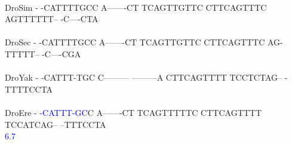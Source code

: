 \documentclass[11pt,twoside,reqno,a4paper]{article}
\begin{document}
{\hspace*{7\charwidth}\hspace*{1\charwidth}\hspace*{1\charwidth}\hspace*{1\charwidth}\hspace*{1\charwidth}\hspace*{1\charwidth}\hspace*{1\charwidth}\\
DroSim	-	-CATTTTGCC	A-------CT	TCAGTTGTTC	CTTCAGTTTC	AGTTTTTT--	-C----CTA\\
\hspace*{7\charwidth}\hspace*{1\charwidth}\hspace*{1\charwidth}\hspace*{1\charwidth}\hspace*{1\charwidth}\hspace*{1\charwidth}\hspace*{1\charwidth}\\
DroSec	-	-CATTTTGCC	A-------CT	TCAGTTGTTC	CTTCAGTTTC	AG-TTTTT--	-C----CGA\\
\hspace*{7\charwidth}\hspace*{1\charwidth}\hspace*{1\charwidth}\hspace*{1\charwidth}\hspace*{1\charwidth}\hspace*{1\charwidth}\hspace*{1\charwidth}\\
DroYak	-	-CATTT-TGC	C---------	---------A	CTTCAGTTTT	TCCTCTAG--	-TTTTCCTA\\
\hspace*{7\charwidth}\hspace*{1\charwidth}\hspace*{1\charwidth}\hspace*{1\charwidth}\hspace*{1\charwidth}\hspace*{1\charwidth}\hspace*{1\charwidth}\\
DroEre	\textcolor{Blue}{-}	\textcolor{Blue}{-}\textcolor{Blue}{C}\textcolor{Blue}{A}\textcolor{Blue}{T}\textcolor{Blue}{T}\textcolor{Blue}{T}\textcolor{Blue}{-}\textcolor{Blue}{G}\textcolor{Blue}{C}C	A-------CT	TCAGTTTTTC	CTTCAGTTTT	TCCATCAG--	--TTTCCTA\\
\hspace*{7\charwidth}\hspace*{0\charwidth}\textcolor{Blue}{6.7}\hspace*{1\charwidth}\hspace*{1\charwidth}\hspace*{1\charwidth}\hspace*{1\charwidth}\hspace*{1\charwidth}\hspace*{1\charwidth}\\
}
\end{document}
